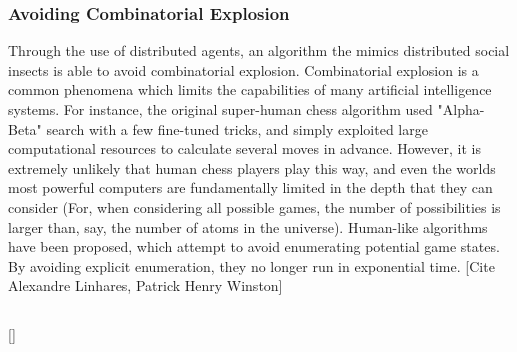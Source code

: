 \documentclass{nature}
\begin{document}
    \subsubsection{Avoiding Combinatorial Explosion}
        Through the use of distributed agents, an algorithm the mimics distributed social insects is able to avoid combinatorial explosion.
        Combinatorial explosion is a common phenomena which limits the capabilities of many artificial intelligence systems.
        For instance, the original super-human chess algorithm used "Alpha-Beta" search with a few fine-tuned tricks, and simply exploited large computational resources to calculate several moves in advance.
        However, it is extremely unlikely that human chess players play this way, and even the worlds most powerful computers are fundamentally limited in the depth that they can consider (For, when considering all possible games, the number of possibilities is larger than, say, the number of atoms in the universe).
        Human-like algorithms have been proposed, which attempt to avoid enumerating potential game states. 
        By avoiding explicit enumeration, they no longer run in exponential time.
        [Cite Alexandre Linhares, Patrick Henry Winston]
\subsection{}
    []
\end{document}
